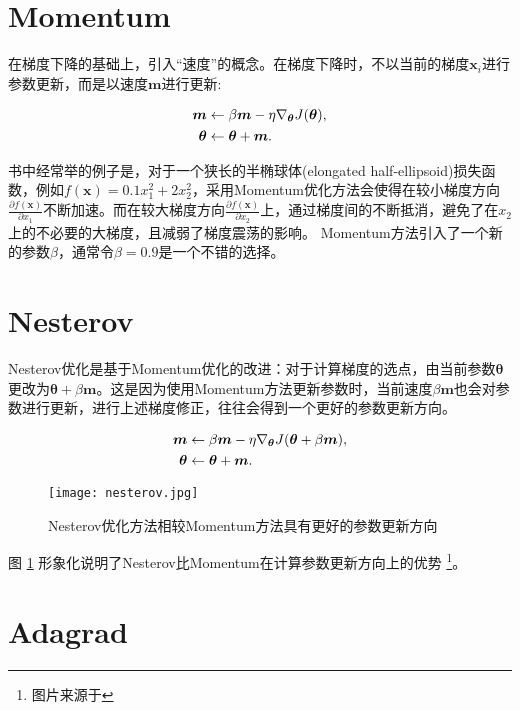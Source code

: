 \section{Momentum}
在梯度下降的基础上，引入“速度”的概念。在梯度下降时，不以当前的梯度${\bm{x}_{i}}$进行参数更新，而是以速度${\bm{m}}$进行更新:

\begin{align}
  \label{momentum}
  \bm{m} &\leftarrow \beta\bm{m} - \eta\nabla_{\bm{\theta}}{J(\bm{\theta})},\\
  \bm{\theta} &\leftarrow \bm{\theta} + \bm{m}. \notag
\end{align}

书中经常举的例子是，对于一个狭长的半椭球体(elongated half-ellipsoid)损失函数，例如$f(\bm{x})=0.1x_{1}^{2}+2x_2^2$，采用Momentum优化方法会使得在较小梯度方向$\frac{\partial f(\bm{x})}{\partial x_1}$不断加速。而在较大梯度方向$\frac{\partial f(\bm{x})}{\partial x_2}$上，通过梯度间的不断抵消，避免了在$x_2$上的不必要的大梯度，且减弱了梯度震荡的影响。
Momentum方法引入了一个新的参数$\beta$，通常令$\beta = 0.9$是一个不错的选择。

\section{Nesterov}

Nesterov优化是基于Momentum优化的改进：对于计算梯度的选点，由当前参数$\bm{\theta}$更改为$\bm{\theta}+\beta\bm{m}$。这是因为使用Momentum方法更新参数时，当前速度$\beta\bm{m}$也会对参数进行更新，进行上述梯度修正，往往会得到一个更好的参数更新方向。

\begin{align}
  \label{nesterov}
  \bm{m} &\leftarrow \beta\bm{m} - \eta\nabla_{\bm{\theta}}{J(\bm{\theta}+\beta\bm{m})},\\
  \bm{\theta} &\leftarrow \bm{\theta} + \bm{m}. \notag
\end{align}

\begin{figure}[htbp]
  \centering
  \texttt{[image: nesterov.jpg]}
  \caption{Nesterov优化方法相较Momentum方法具有更好的参数更新方向 \label{fig:nesterov}}
\end{figure}

图 \ref{fig:nesterov} 形象化说明了Nesterov比Momentum在计算参数更新方向上的优势\cite{geron2022hands} \footnote{图片来源于\cite{geron2022hands}}。


\section{Adagrad}

